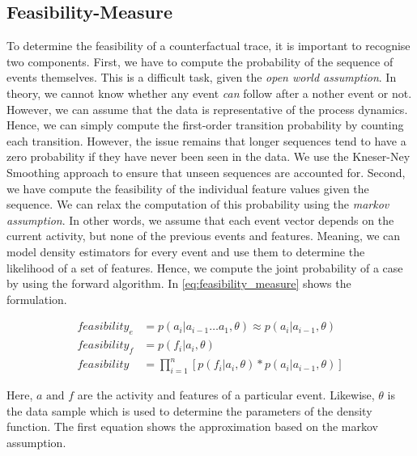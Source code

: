 \documentclass[./../../paper.tex]{subfiles}
\begin{document}
\subsection{Feasibility-Measure}
To determine the feasibility of a counterfactual trace, it is important to recognise two components. First, we have to compute the probability of the sequence of events themselves. This is a difficult task, given the \emph{open world assumption}. In theory, we cannot know whether any event \emph{can} follow after a nother event or not. However, we can assume that the data is representative of the process dynamics. Hence, we can simply compute the first-order transition probability by counting each transition. However, the issue remains that longer sequences tend to have a zero probability if they have never been seen in the data. We use the Kneser-Ney Smoothing\autocite{chen_empiricalstudysmoothing_1999} approach to ensure that unseen sequences are accounted for.
Second, we have compute the feasibility of the individual feature values given the sequence. We can relax the computation of this probability using the \emph{markov assumption}. In other words, we assume that each event vector depends on the current activity, but none of the previous events and features. Meaning, we can model density estimators for every event and use them to determine the likelihood of a set of features. Hence, we compute the joint probability of a case by using the forward algorithm. In \autoref{eq:feasibility_measure} shows the formulation.

\begin{align}
    \label{eq:feasibility_measure}
    feasibility_e & =p(a_i|a_{i-1} \ldots a_1, \theta) \approx  p(a_i|a_{i-1}, \theta) \nonumber\\ 
    feasibility_f & =p(f_i|a_i, \theta) \nonumber\\
    feasibility & = \prod_{i=1}^{n}\left[p(f_i|a_i, \theta) * p(a_i|a_{i-1}, \theta)\right] 
\end{align}

\noindent Here, $a \text{ and } f$ are the activity and features of a particular event. Likewise, $\theta$ is the data sample which is used to determine the parameters of the density function. The first equation shows the approximation based on the markov assumption. 
\end{document}
